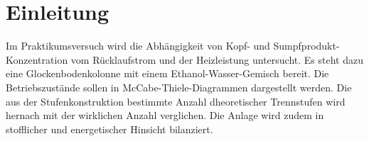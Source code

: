 %
\pagebreak
\section{Einleitung}
\label{sec:einleitung}
Im Praktikumsversuch wird die Abhängigkeit von Kopf- und Sumpfprodukt-Konzentration vom Rücklaufstrom und der Heizleistung untersucht. Es steht dazu eine Glockenbodenkolonne mit einem Ethanol-Wasser-Gemisch bereit. Die Betriebszustände sollen in McCabe-Thiele-Diagrammen dargestellt werden. Die aus der Stufenkonstruktion bestimmte Anzahl dheoretischer Trennstufen wird hernach mit der wirklichen Anzahl verglichen. Die Anlage wird zudem in stofflicher und energetischer Hinsicht bilanziert.



